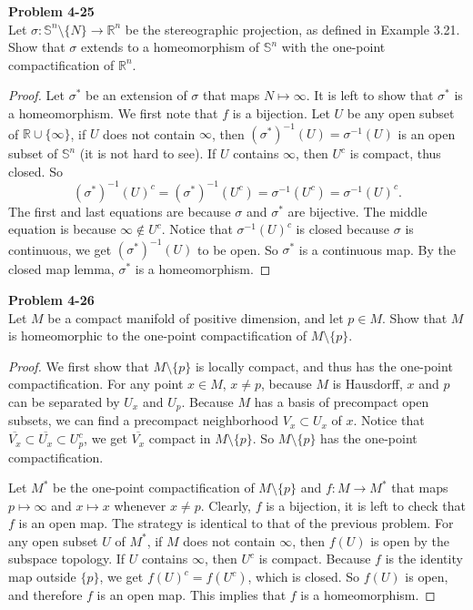 \documentclass[12pt, a4paper]{article}
\theoremstyle{plain}
\newcommand{\R}{\mathbb{R}}
\newcommand{\mS}{\mathbb{S}}
\newenvironment{problem}[2][Problem]
    { \begin{mdframed}[backgroundcolor=gray!20] \textbf{#1 #2} \\}
    {  \end{mdframed}}
\begin{document}
\begin{problem}{4-25}
    Let $\sigma: \mS^n\setminus\{N\}\to \R^n$ be the stereographic projection, as defined in Example 3.21. Show that $\sigma$ extends to a homeomorphism of $\mS^n$ with the one-point compactification of $\R^n$. 
\end{problem}
    \begin{proof}
        Let $\sigma^*$ be an extension of $\sigma$ that maps $N\mapsto \infty$. It is left to show that $\sigma^*$ is a homeomorphism. We first note that $f$ is a bijection. Let $U$ be any open subset of $\R\cup\{\infty\}$, if $U$ does not contain $\infty$, then $(\sigma^{*})^{-1}(U)=\sigma^{-1}(U)$ is an open subset of $\mS^n$ (it is not hard to see). If $U$ contains $\infty$, then $U^c$ is compact, thus closed. So $$(\sigma^{*})^{-1}(U)^c = (\sigma^{*})^{-1}(U^c) = \sigma^{-1}(U^c)=\sigma^{-1}(U)^c.$$
        The first and last equations are because $\sigma$ and $\sigma^*$ are bijective. The middle equation is because $\infty\not\in U^c$. Notice that $\sigma^{-1}(U)^c$ is closed because $\sigma$ is continuous, we get $(\sigma^{*})^{-1}(U)$ to be open. So $\sigma^*$ is a continuous map. By the closed map lemma, $\sigma^*$ is a homeomorphism.
    \end{proof}


\pagebreak
\begin{problem}{4-26}
    Let $M$ be a compact manifold of positive dimension, and let $p\in M$. Show that $M$ is homeomorphic to the one-point compactification of $M\setminus \{p\}$.
\end{problem}
    \begin{proof}
        We first show that $M\setminus\{p\}$ is locally compact, and thus has the one-point compactification. For any point $x\in M$, $x\neq p$, because $M$ is Hausdorff, $x$ and $p$ can be separated by $U_x$ and $U_p$. Because $M$ has a basis of precompact open subsets, we can find a precompact neighborhood $V_x\subset U_x$ of $x$. Notice that $\overline{V_x}\subset \overline{U_x}\subset U_p^c$, we get $\overline{V_x}$ compact in $M\setminus\{p\}$. So $M\setminus\{p\}$ has the one-point compactification.
        
        Let $M^*$ be the one-point compactification of $M\setminus\{p\}$ and $f:M\to M^*$ that maps $p\mapsto \infty$ and $x\mapsto x$ whenever $x\neq p$. Clearly, $f$ is a bijection, it is left to check that $f$ is an open map. The strategy is identical to that of the previous problem. For any open subset $U$ of $M^*$, if $M$ does not contain $\infty$, then $f(U)$ is open by the subspace topology. If $U$ contains $\infty$, then $U^c$ is compact. Because $f$ is the identity map outside $\{p\}$, we get $f(U)^c=f(U^c)$, which is closed. So $f(U)$ is open, and therefore $f$ is an open map. This implies that $f$ is a homeomorphism.
    \end{proof}
\end{document}
